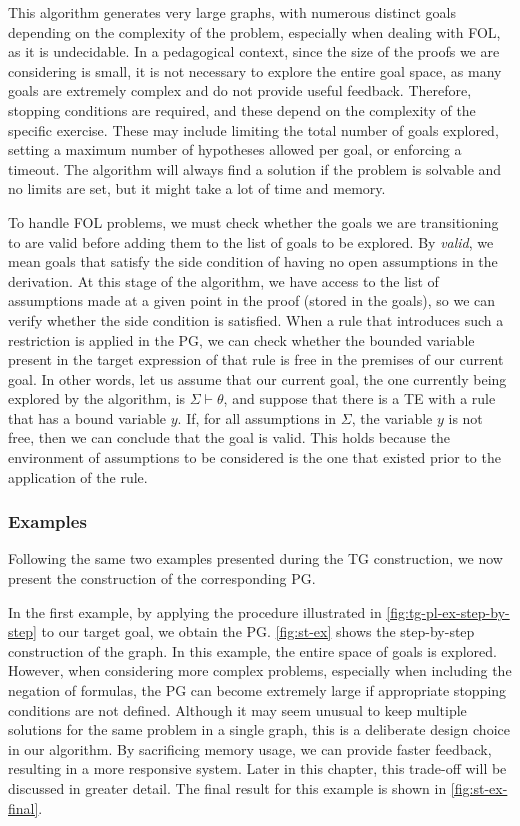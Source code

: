 This algorithm generates very large graphs, with numerous distinct goals depending on the complexity of the problem, especially when dealing with \gls{FOL}, as it is undecidable. In a pedagogical context, since the size of the proofs we are considering is small, it is not necessary to explore the entire goal space, as many goals are extremely complex and do not provide useful feedback. Therefore, stopping conditions are required, and these depend on the complexity of the specific exercise. These may include limiting the total number of goals explored, setting a maximum number of hypotheses allowed per goal, or enforcing a timeout. The algorithm will always find a solution if the problem is solvable and no limits are set, but it might take a lot of time and memory.

To handle \gls{FOL} problems, we must check whether the goals we are transitioning to are valid before adding them to the list of goals to be explored. By \emph{valid}, we mean goals that satisfy the side condition of having no open assumptions in the derivation. 
At this stage of the algorithm, we have access to the list of assumptions made at a given point in the proof (stored in the goals), so we can verify whether the side condition is satisfied. When a rule that introduces such a restriction is applied in the \gls{PG}, we can check whether the bounded variable present in the target expression of that rule is free in the premises of our current goal. 
In other words, let us assume that our current goal, the one currently being explored by the algorithm, is \(\Sigma \vdash \theta\), and suppose that there is a \gls{TE} with a rule that has a bound variable \(y\). If, for all assumptions in \(\Sigma\), the variable \(y\) is not free, then we can conclude that the goal is valid. This holds because the environment of assumptions to be considered is the one that existed prior to the application of the rule.

\vspace{-0.5cm}

\subsubsection*{Examples}
Following the same two examples presented during the \gls{TG} construction, we now present the construction of the corresponding \gls{PG}.

\vspace{1em}
In the first example, by applying the procedure illustrated in \autoref{fig:tg-pl-ex-step-by-step} to our target goal, we obtain the \gls{PG}. \autoref{fig:st-ex} shows the step-by-step construction of the graph. In this example, the entire space of goals is explored. However, when considering more complex problems, especially when including the negation of formulas, the \gls{PG} can become extremely large if appropriate stopping conditions are not defined. 
Although it may seem unusual to keep multiple solutions for the same problem in a single graph, this is a deliberate design choice in our algorithm. By sacrificing memory usage, we can provide faster feedback, resulting in a more responsive system. Later in this chapter, this trade-off will be discussed in greater detail. The final result for this example is shown in \autoref{fig:st-ex-final}.

